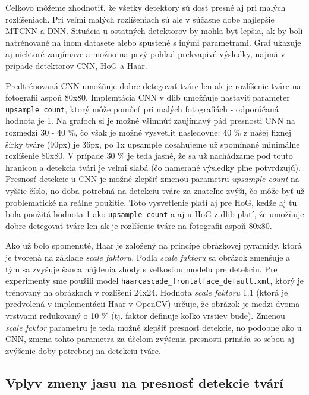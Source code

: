 \documentclass[]{article}
\begin{document}
	Celkovo môžeme zhodnotiť, že všetky detektory sú dosť presné aj pri malých rozlíšeniach. Pri veľmi malých rozlíšeniach sú ale v súčasne dobe najlepšie MTCNN a DNN.
	Situácia u ostatných detektorov by mohla byť lepšia, ak by boli natrénované na inom datasete alebo spustené s inými parametrami. Graf ukazuje aj niektoré zaujímave a možno na prvý pohľad prekvapivé výsledky, najmä v prípade detektorov CNN, HoG a Haar. 
	
	Predtrénovaná CNN umožňuje dobre detegovať tváre len ak je rozlíšenie tváre na fotografii aspoň 80x80. Implemtácia CNN v dlib umožňuje nastaviť parameter \texttt{upsample count}, ktorý môže pomôcť pri malých fotografiách \-- odporúčaná hodnota je 1. Na grafoch si je možné všimnúť zaujímavý pád presnosti CNN na rozmedzí 30 \-- 40 \%, čo však je možné vysvetliť nasledovne: 40 \% z našej fixnej šírky tváre (90px) je 36px, po 1x upsample dosahujeme už spomínané minimálne rozlíšenie 80x80. V prípade 30 \% je teda jasné, že sa už nachádzame pod touto hranicou a detekcia tvári je veľmi slabá (čo namerané výsledky plne potvrdzujú). Presnosť detekcie u CNN je možné zlepšiť zmenou parametru \textit{upsample count} na vyššie číslo, no doba potrebná na detekciu tváre za znateľne zvýši, čo môže byť už problematické na reálne použitie. Toto vysvetlenie platí aj pre HoG, keďže aj tu bola použitá hodnota 1 ako \texttt{upsample count} a aj u HoG z dlib platí, že umožňuje dobre detegovať tváre len ak je rozlíšenie tváre na fotografii aspoň 80x80.

	Ako už bolo spomenuté, Haar je založený na princípe obrázkovej pyramídy, ktorá je tvorená na základe \textit{scale faktoru}. Podľa \textit{scale faktoru} sa obrázok zmenšuje a tým sa zvyšuje šanca nájdenia zhody s veľkosťou modelu pre detekciu. Pre experimenty sme použili model \texttt{haarcascade\_frontalface\_default.xml}, ktorý je trénovaný na obrázkoch v rozlíšení 24x24. Hodnota \textit{scale faktoru} 1.1 (ktorá je predvolená v implementácii Haar v OpenCV) určuje, že obrázok je medzi dvoma vrstvami redukovaný o 10 \% (tj. faktor definuje koľko vrstiev bude). Zmenou \textit{scale faktor} parametru je teda možné zlepšiť presnosť detekcie, no podobne ako u CNN, zmena tohto parametra za účelom zvýšenia presnosti prináša so sebou aj zvýšenie doby potrebnej na detekciu tváre. 
	
	\newpage
	\subsection*{Vplyv zmeny jasu na presnosť detekcie tvárí}
	
\end{document}
